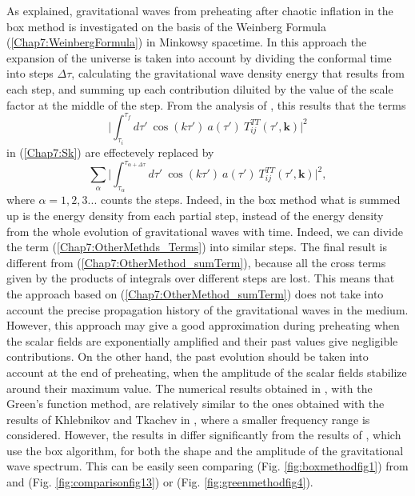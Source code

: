 \documentclass[11pt,a4paper,twoside]{book}
\begin{document}
As explained, gravitational waves from preheating after chaotic inflation in the box method is investigated on the basis of the Weinberg Formula (\ref{Chap7:WeinbergFormula}) in Minkowsy spacetime. In this approach the expansion of the universe is taken into account by dividing the conformal time into steps $\Delta \tau$, calculating the gravitational wave density energy that results from each step, and summing up each contribution diluited by the value of the scale factor at the middle of the step. From the analysis of \cite{Chap7:GreenMethod}, this results that the terms 
\begin{equation}
\label{Chap7:OtherMethds_Terms}
\Bigg|\int_{\tau_{i}}^{\tau_{f}}d \tau'\ \cos(k\tau')\ a(\tau')\ T^{TT}_{ij}(\tau',\textbf{k}) \Bigg|^{2}
\end{equation}
in (\ref{Chap7:Sk}) are effectevely replaced  by
\begin{equation}
\label{Chap7:OtherMethod_sumTerm}
\sum_{\alpha}\Bigg|\int_{\tau_{\alpha}}^{\tau_{\alpha + \Delta \tau}}d \tau'\ \cos(k\tau')\ a(\tau')\ T^{TT}_{ij}(\tau',\textbf{k}) \Bigg|^{2},
\end{equation}
where $\alpha=1,2,3...$ counts the steps. Indeed, in the box method what is summed up is the energy density from each partial step, instead of the energy density from the whole evolution of gravitational waves with time. Indeed, we can divide the term (\ref{Chap7:OtherMethds_Terms}) into similar steps. The final result is different from (\ref{Chap7:OtherMethod_sumTerm}), because all the cross terms given by the products of integrals over different steps are lost. This means that the approach based on (\ref{Chap7:OtherMethod_sumTerm}) does not take into account the precise propagation history of the gravitational waves in the medium. However, this approach may give a good approximation during preheating when the scalar fields are exponentially amplified and their past values give negligible contributions. On the other hand, the past evolution should be taken into account at the end of preheating, when the amplitude of the scalar fields  stabilize around their maximum value. The numerical results obtained in \cite{Chap7:GreenMethod}, with the Green's function method, are relatively similar to the ones obtained with the results of Khlebnikov  and Tkachev in \cite{Chap7:WeinbergBoxMethod}, where a smaller frequency range is considered. However, the results in \cite{Chap7:GreenMethod} differ significantly from the results of \cite{Chap7:BoxMethod}, which use the box algorithm, for both the shape and the amplitude of the gravitational wave spectrum. This can be easily seen comparing (Fig. \ref{fig:boxmethodfig1}) from \cite{Chap7:BoxMethod} and (Fig. \ref{fig:comparisonfig13}) or (Fig. \ref{fig:greenmethodfig4}). 
\end{document}
